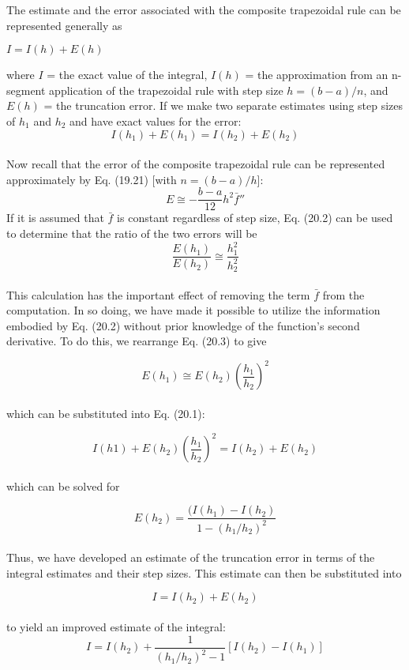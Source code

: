 \documentclass[../main.tex]{subfiles}
\begin{document}
The estimate and the error associated with the composite trapezoidal rule can be represented generally as

	\begin{flushleft}
	$I=I(h)+E(h)$
	\end{flushleft}
	
where $I$ = the exact value of the integral, $I(h)$ = the approximation from an n-segment
application of the trapezoidal rule with step size $h = (b − a)/n$, and $E(h)$ = the truncation
error. If we make two separate estimates using step sizes of $h_1$ and $h_2$ and have exact values for the error:\\
\begin{equation}
	\tag{20.1}
	I(h_1)+E(h_1)=I(h_2)+E(h_2)
\end{equation}\\
Now recall that the error of the composite trapezoidal rule can be represented approximately by Eq. (19.21) [with $n = (b − a)/h$]:
\begin{equation}
	\tag{20.2}
	E\cong-\dfrac{b-a}{12}h^{2}\bar{f}''
\end{equation}
If it is assumed that $\bar{f}$ is constant regardless of step size, Eq. (20.2) can be used to determine that the ratio of the two errors will be
\begin{equation}
	\tag{20.3}
	\dfrac{E(h_1)}{E(h_2)}\cong\dfrac{h^{2}_{1}}{h^{2}_{2}}
\end{equation}\\
This calculation has the important effect of removing the term $\bar{f}$ from the computation.
In so doing, we have made it possible to utilize the information embodied by Eq. (20.2) without prior knowledge of the function's second derivative. To do this, we rearrange
Eq. (20.3) to give

	$$E(h_1) \cong E(h_2)\left(\dfrac{h_1}{h_2} \right)^2$$\\
which can be substituted into Eq. (20.1):

	$$I(h1)+E(h_2)\left(\dfrac{h_1}{h_2} \right)^2=I(h_2)+E(h_2)$$\\
which can be solved for

	$$E(h_2)=\dfrac{(I(h_1)-I(h_2)}{1-(h_1/h_2)^2}$$\\
Thus, we have developed an estimate of the truncation error in terms of the integral estimates and their step sizes. This estimate can then be substituted into

	$$I=I(h_2)+E(h_2)$$\\
to yield an improved estimate of the integral:
\begin{equation}
	\tag{20.4}
	I=I(h_2)+\dfrac{1}{(h_1/h_2)^2-1}[I(h_2)-I(h_1)]
\end{equation}
\end{document}
